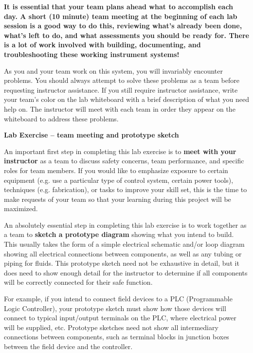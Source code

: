 \begin{itemize}
\vskip 10pt

{\bf It is essential that your team plans ahead what to accomplish each day.  A short (10 minute) team meeting at the beginning of each lab session is a good way to do this, reviewing what's already been done, what's left to do, and what assessments you should be ready for.  There is a lot of work involved with building, documenting, and troubleshooting these working instrument systems!}

As you and your team work on this system, you will invariably encounter problems.  You should always attempt to solve these problems as a team before requesting instructor assistance.  If you still require instructor assistance, write your team's color on the lab whiteboard with a brief description of what you need help on.  The instructor will meet with each team in order they appear on the whiteboard to address these problems.





\vfil \eject

\noindent
{\bf Lab Exercise -- team meeting and prototype sketch}

\vskip 5pt

An important first step in completing this lab exercise is to {\bf meet with your instructor} as a team to discuss safety concerns, team performance, and specific roles for team members.  If you would like to emphasize exposure to certain equipment (e.g. use a particular type of control system, certain power tools), techniques (e.g. fabrication), or tasks to improve your skill set, this is the time to make requests of your team so that your learning during this project will be maximized.

\vskip 10pt

An absolutely essential step in completing this lab exercise is to work together as a team to {\bf sketch a prototype diagram} showing what you intend to build.  This usually takes the form of a simple electrical schematic and/or loop diagram showing all electrical connections between components, as well as any tubing or piping for fluids.  This prototype sketch need not be exhaustive in detail, but it does need to show enough detail for the instructor to determine if all components will be correctly connected for their safe function.

For example, if you intend to connect field devices to a PLC (Programmable Logic Controller), your prototype sketch must show how those devices will connect to typical input/output terminals on the PLC, where electrical power will be supplied, etc.  Prototype sketches need not show all intermediary connections between components, such as terminal blocks in junction boxes between the field device and the controller.


\end{itemize}
